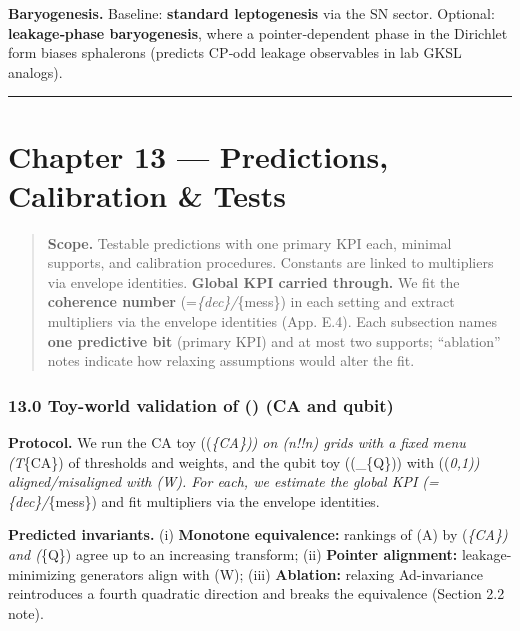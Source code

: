 \documentclass[
]{article}
\numberwithin{equation}{section}
\begin{document}
\textbf{Baryogenesis.} Baseline: \textbf{standard leptogenesis} via the
SN sector. Optional: \textbf{leakage‑phase baryogenesis}, where a
pointer‑dependent phase in the Dirichlet form biases sphalerons
(predicts CP‑odd leakage observables in lab GKSL analogs).

\begin{center}\rule{0.5\linewidth}{0.5pt}\end{center}

\hypertarget{chapter-13-predictions-calibration-tests}{%
\section{Chapter 13 --- Predictions, Calibration \&
Tests}\label{chapter-13-predictions-calibration-tests}}

\begin{quote}
\textbf{Scope.} Testable predictions with one primary KPI each, minimal
supports, and calibration procedures. Constants are linked to
multipliers via envelope identities. \textbf{Global KPI carried
through.} We fit the \textbf{coherence number}
(\chi=\tau\emph{\{\rm dec\}/\tau}\{\rm mess\}) in each setting and
extract multipliers via the envelope identities (App. E.4). Each
subsection names \textbf{one predictive bit} (primary KPI) and at most
two supports; ``ablation'' notes indicate how relaxing assumptions would
alter the fit.
\end{quote}

\hypertarget{toy-world-validation-of-ca-and-qubit}{%
\subsubsection{\texorpdfstring{13.0 Toy-world validation of
() (CA and
qubit)}{13.0 Toy-world validation of () (CA and qubit)}}\label{toy-world-validation-of-ca-and-qubit}}

\textbf{Protocol.} We run the CA toy ((\emph{\{\rm CA\})) on
(n!\times!n) grids with a fixed menu (\mathscr T}\{\rm CA\}) of
thresholds and weights, and the qubit toy ((\_\{\rm Q\}))
with ((\rho\emph{0,\rho\emph{1)) aligned/misaligned with (W). For each,
we estimate the global KPI (\chi=\tau}\{\rm dec\}/\tau}\{\rm mess\}) and
fit multipliers via the envelope identities.

\textbf{Predicted invariants.} (i) \textbf{Monotone equivalence:}
rankings of (A) by (\emph{\{\rm CA\}) and
(}\{\rm Q\}) agree up to an increasing transform; (ii)
\textbf{Pointer alignment:} leakage-minimizing generators align with
(W); (iii) \textbf{Ablation:} relaxing Ad-invariance reintroduces a
fourth quadratic direction and breaks the equivalence (Section 2.2
note).
\end{document}
